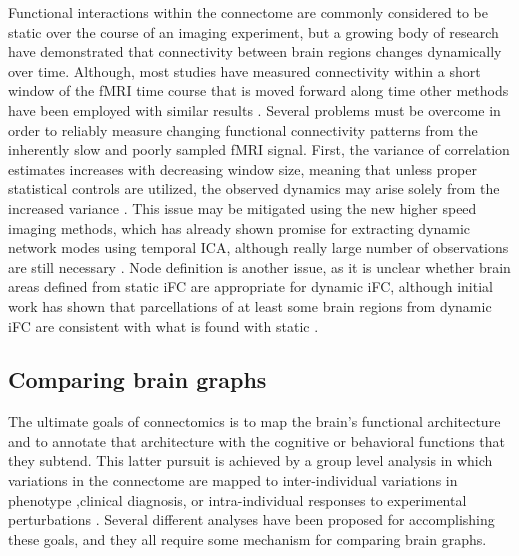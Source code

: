 Functional interactions within the connectome are commonly considered to be static over the course of an imaging experiment, but a growing body of research have demonstrated that connectivity between brain regions changes dynamically over time\cite{Hutchison2013}. Although, most studies have measured connectivity within a short window of the fMRI time course that is moved forward along time \cite{Keilholz2013,Chang2010,Yang2014,Allen2014} other methods have been employed with similar results \cite{Majeed2011,Smith2012}. Several problems must be overcome in order to reliably measure changing functional connectivity patterns from the inherently slow and poorly sampled fMRI signal. First, the variance of correlation estimates increases with decreasing window size, meaning that unless proper statistical controls are utilized, the observed dynamics may arise solely from the increased variance \cite{Handwerker2012}. This issue may be mitigated using the new higher speed imaging methods, which has already shown promise for extracting dynamic network modes using temporal ICA, although really large number of observations are still necessary \cite{Smith2012}. Node definition is another issue, as it is unclear whether brain areas defined from static iFC are appropriate for dynamic iFC, although initial work has shown that parcellations of at least some brain regions from dynamic iFC are consistent with what is found with static \cite{Yang2014}.

\subsection{Comparing brain graphs} 

The ultimate goals of connectomics is to map the brain's functional architecture and to annotate that architecture with the cognitive or behavioral functions that they subtend. This latter pursuit is achieved by a group level analysis in which variations in the connectome are mapped to inter-individual variations in phenotype \cite{Kelly2012},clinical diagnosis\cite{Castellanos2013}, or intra-individual responses to experimental perturbations \cite{Shirer2012}. Several different analyses have been proposed for accomplishing these goals, and they all require some mechanism for comparing brain graphs\cite{Varoquaux2013}. 
 
